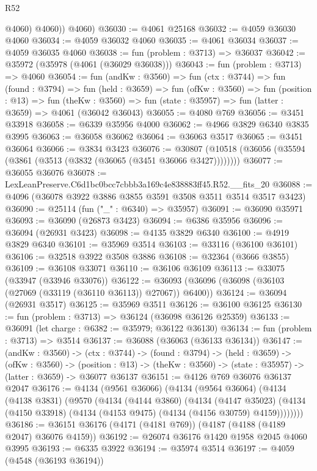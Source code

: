 \begin{lexlean}{R52}
\begin{coremodule}
            @4060)
          @4060))
      @4060)
@36030 := @4061 @25168
@36032 := @4059 @36030 @4060
@36034 := @4059 @36032 @4060
@36035 := @4061 @36034
@36037 := @4059 @36035 @4060
@36038 := fun (problem : @3713) => @36037
@36042 := @35972 (@35978 (@4061 (@36029 @36038)))
@36043 := fun (problem : @3713) => @4060
@36054 := fun (andKw : @3560) =>
  fun (ctx : @3744) =>
  fun (found : @3794) =>
  fun (held : @3659) =>
  fun (ofKw : @3560) =>
  fun (position : @13) =>
  fun (theKw : @3560) => fun (state : @35957) => fun (latter : @3659) => @4061 (@36042 @36043)
@36055 := @4080 @769
@36056 := @3451 @33918
@36058 := @6339 @35956 @4000
@36062 := @4966 @3829 @6340 @3835 @3995
@36063 := @36058 @36062
@36064 := @36063 @3517
@36065 := @3451 @36064
@36066 := @3834 @3423
@36076 := @30807 (@10518 (@36056 (@35594 (@3861 (@3513 (@3832 (@36065 (@3451 @36066 @3427))))))))
@36077 := @36055 @36076
@36078 := LexLeanPreserve.C6d1bc0bcc7cbbb3a169c4e838883ff45.R52.__fits_20
@36088 := @4096 (@36078 @3922 @3886 @3855 @3591 @3508 @3511 @3514 @3517 @3423)
@36090 := @25114 (fun ("_" : @6340) => @35957)
@36091 := @36090 @35971
@36093 := @36090 (@26873 @3423)
@36094 := @6386 @35956
@36096 := @36094 (@26931 @3423)
@36098 := @4135 @3829 @6340
@36100 := @4919 @3829 @6340
@36101 := @35969 @3514
@36103 := @33116 (@36100 @36101)
@36106 := @32518 @3922 @3508 @3886
@36108 := @32364 (@3666 @3855)
@36109 := @36108 @33071
@36110 := @36106 @36109
@36113 := @33075 (@33947 (@33946 @33076))
@36122 := @36093 (@36096 (@36098 (@36103 (@27069 (@33119 (@36110 @36113)) @27067)) @6400))
@36124 := @36094 (@26931 @3517)
@36125 := @35969 @3511
@36126 := @36100 @36125
@36130 := fun (problem : @3713) => @36124 (@36098 @36126 @25359)
@36133 := @36091 (let charge : @6382 := @35979; @36122 @36130)
@36134 := fun (problem : @3713) => @3514
@36137 := @36088 (@36063 (@36133 @36134))
@36147 := (andKw : @3560) ->
  (ctx : @3744) ->
  (found : @3794) ->
  (held : @3659) ->
  (ofKw : @3560) ->
  (position : @13) -> (theKw : @3560) -> (state : @35957) -> (latter : @3659) -> @36077 @36137
@36151 := @4126 @769 @36076 @36137 @2047
@36176 := @4134
    (@9561 @36066)
    (@4134
      (@9564 @36064)
      (@4134
        (@4138 @3831)
        (@9570
          (@4134
            (@4144 @3860)
            (@4134
              (@4147 @35023)
              (@4134 (@4150 @33918) (@4134 (@4153 @9475) (@4134 (@4156 @30759) @4159))))))))
@36186 := @36151 @36176 (@4171 (@4181 @769)) (@4187 (@4188 (@4189 @2047) @36076 @4159))
@36192 := @26074 @36176 @1420 @1958 @2045 @4060 @3995
@36193 := @6335 @3922
@36194 := @35974 @3514
@36197 := @4059 (@4548 (@36193 @36194))

\end{coremodule}
\end{lexlean}
